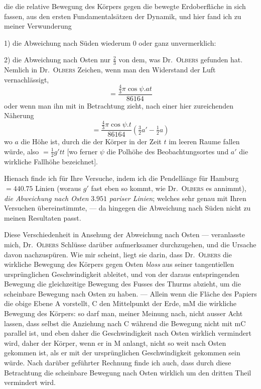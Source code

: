 die die relative Bewegung des Körpers gegen die bewegte Erdoberfläche in sich fassen, aus den ersten Fundamentalsätzen der Dynamik, und hier fand ich zu meiner Verwunderung

1) die Abweichung nach Süden wiederum $0$ oder ganz unvermerklich:

2) die Abweichung nach Osten nur $\tfrac23$ von dem, was Dr.\ \textsc{Olbers} gefunden hat. Nemlich in Dr.\ \textsc{Olbers} Zeichen, wenn man den Widerstand der Luft vernachlässigt,
\[
=\frac{\tfrac43\pi\cos\psi.at}{86164}
\]
oder wenn man ihn mit in Betrachtung zieht, nach einer hier zureichenden Näherung
\[
=\frac{\tfrac43\pi\cos\psi.t}{86164}(\tfrac32a'-\tfrac12a)
\]
wo $a$ die Höhe ist, durch die der Körper in der Zeit $t$ im leeren Raume fallen würde, also $=\tfrac12g'tt$ [wo ferner $\psi$ die Polhöhe des Beobachtungsortes und $a'$ die wirkliche Fallhöhe bezeichnet].

Hienach finde ich für Ihre Versuche, indem ich die Pendellänge für Hamburg $=440.75$ Linien (woraus $g'$ fast eben so kommt, wie Dr.\ \textsc{Olbers} es annimmt), \textit{die Abweichung nach Osten} $3.951$ \textit{pariser Linien}; welches sehr genau mit Ihren Versuchen übereinstimmte, — da hingegen die Abweichung nach Süden nicht zu meinen Resultaten passt.

\begin{center}\resizebox{!}{58mm}{}\end{center}
Diese Verschiedenheit in Ansehung der Abweichung nach Osten — veranlasste mich, Dr.\ \textsc{Olbers} Schlüsse darüber aufmerksamer durchzugehen, und die Ursache davon nachzuspüren. Wie mir scheint, liegt sie darin, dass Dr.\ \textsc{Olbers} die wirkliche Bewegung des Körpers gegen Osten \textit{bloss} aus seiner tangentiellen ursprünglichen Geschwindigkeit ableitet, und von der daraus entspringenden Bewegung die gleichzeitige Bewegung des Fusses des Thurms abzieht, um die scheinbare Bewegung nach Osten zu haben. — Allein wenn die Fläche des Papiers die obige Ebene $\mathrm{A}$ vorstellt, $\mathrm{C}$ den Mittelpunkt der Erde, $\mathrm{mM}$ die wirkliche Bewegung des Körpers: so darf man, meiner Meinung nach, nicht ausser Acht lassen, dass selbst die Anziehung nach $\mathrm{C}$ während die Bewegung nicht mit $\mathrm{mC}$ parallel ist, und eben daher die Geschwindigkeit nach Osten wirklich vermindert wird, daher der Körper, wenn er in $\mathrm{M}$ anlangt, nicht so weit nach Osten gekommen ist, als er mit der ursprünglichen Geschwindigkeit gekommen sein würde. Nach darüber geführter Rechnung finde ich auch, dass durch diese Betrachtung die scheinbare Bewegung nach Osten wirklich um den dritten Theil vermindert wird.


